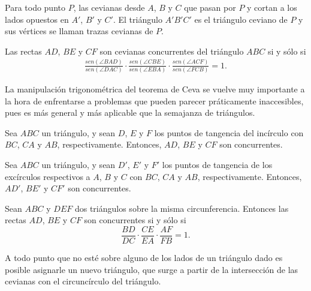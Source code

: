 \begin{section-definition.tcb}
    Para todo punto $P$, las cevianas desde $A$, $B$ y $C$ que pasan por $P$ y cortan a los lados opuestos en $A'$, $B'$ y $C'$.
    El triángulo $A'B'C'$ es el triángulo ceviano de $P$ y sus vértices se llaman trazas cevianas de $P$.
\end{section-definition.tcb}

\begin{section-theorem.tcb}
    Las rectas $AD$, $BE$ y $CF$ son cevianas concurrentes del triángulo $ABC$ si y sólo si
    \begin{gather*}
        \frac{sen(\angle BAD)}{sen(\angle DAC)} \cdot \frac{sen(\angle CBE)}{sen(\angle EBA)} \cdot \frac{sen(\angle ACF)}{sen(\angle FCB)} = 1.
    \end{gather*}
\end{section-theorem.tcb}

La manipulación trigonométrica del teorema de Ceva se vuelve muy importante a la hora de enfrentarse a problemas que pueden parecer práticamente inaccesibles, pues es más general y más aplicable que la semajanza de triángulos.

\begin{section-definition.tcb}
    Sea $ABC$ un triángulo, y sean $D$, $E$ y $F$ los puntos de tangencia del incírculo con $BC$, $CA$ y $AB$, respectivamente.
    Entonces, $AD$, $BE$ y $CF$ son concurrentes.
\end{section-definition.tcb}

\begin{section-definition.tcb}
    Sea $ABC$ un triángulo, y sean $D'$, $E'$ y $F'$ los puntos de tangencia de los excírculos respectivos a $A$, $B$ y $C$ con $BC$, $CA$ y $AB$, respectivamente.
    Entonces, $AD'$, $BE'$ y $CF'$ son concurrentes.
\end{section-definition.tcb}


\begin{section-theorem.tcb}
    Sean $ABC$ y $DEF$ dos triángulos sobre la misma circunferencia.
    Entonces las rectas $AD$, $BE$ y $CF$ son concurrentes si y sólo si
    \[\frac{BD}{DC} \cdot \frac{CE}{EA} \cdot \frac{AF}{FB} = 1.\]
\end{section-theorem.tcb}

\begin{section-definition.tcb}
    A todo punto que no esté sobre alguno de los lados de un triángulo dado es posible asignarle un nuevo triángulo, que surge a partir de la intersección de las cevianas con el circuncírculo del triángulo.
\end{section-definition.tcb}

